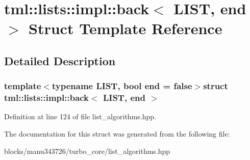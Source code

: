\hypertarget{structtml_1_1lists_1_1impl_1_1back}{\section{tml\+:\+:lists\+:\+:impl\+:\+:back$<$ L\+I\+S\+T, end $>$ Struct Template Reference}
\label{structtml_1_1lists_1_1impl_1_1back}
}


\subsection{Detailed Description}
\subsubsection*{template$<$typename L\+I\+S\+T, bool end = false$>$struct tml\+::lists\+::impl\+::back$<$ L\+I\+S\+T, end $>$}



Definition at line 124 of file list\+\_\+algorithms.\+hpp.



The documentation for this struct was generated from the following file\+:\begin{DoxyCompactItemize}
\item 
blocks/manu343726/turbo\+\_\+core/list\+\_\+algorithms.\+hpp\end{DoxyCompactItemize}
